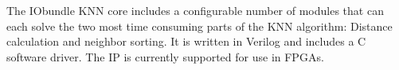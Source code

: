 The IObundle KNN core includes a configurable number of modules that can each solve the two most time consuming parts of
the KNN algorithm: Distance calculation and neighbor sorting.
It is written in Verilog and includes a C software driver.
The IP is currently supported for use in FPGAs.
